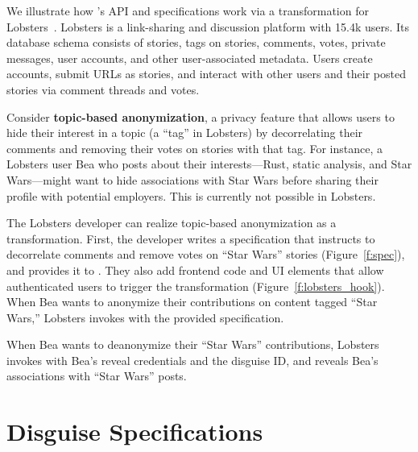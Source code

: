 We illustrate how \sys's API and \xx specifications work via a \xxing
transformation for Lobsters~\cite{lobsters}.  Lobsters is a
link-sharing and discussion platform with 15.4k
users.
%
Its database schema consists of stories, tags on stories, comments, votes,
private messages, user accounts, and other user-associated metadata.
%
Users create accounts, submit URLs as stories, and interact with other users
and their posted stories via comment threads and votes.
%

Consider \textbf{topic-based anonymization}, a privacy feature that allows users to
hide their interest in a topic (a ``tag'' in Lobsters) by decorrelating
their comments and removing their votes on stories with that tag.
%
For instance, a Lobsters user Bea who posts about their interests---Rust,
static analysis, and Star Wars---might want to hide associations with
Star Wars before sharing their profile with potential employers.
%
This is currently not possible in Lobsters.

%
The Lobsters developer can realize topic-based anonymization as a \xxing
transformation.
%
First, the developer writes a \xx specification that instructs \sys to
decorrelate comments and remove votes on ``Star Wars'' stories
(Figure~\ref{f:spec}), and provides it to \sys.
%
They also add frontend code and UI elements that allow authenticated users to
trigger the \xxing transformation (Figure~\ref{f:lobsters_hook}).
%
When Bea wants to anonymize their contributions on content tagged ``Star Wars,''
Lobsters invokes \sys with the provided specification.

%
When Bea wants to deanonymize their ``Star Wars'' contributions, Lobsters
invokes \sys with Bea's reveal credentials and the disguise ID, and \sys reveals
Bea's associations with ``Star Wars'' posts.
%


\section{Disguise Specifications}
\label{s:spec}

